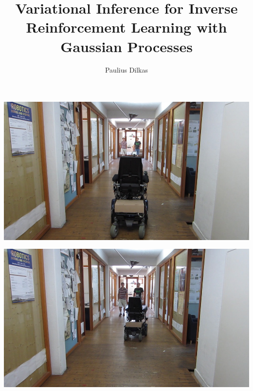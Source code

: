 \documentclass{beamer}
\author{Paulius Dilkas}
\title{Variational Inference for Inverse Reinforcement Learning with Gaussian
  Processes}
\begin{document}
\maketitle

\begin{frame}
  \includegraphics[width=\textwidth]{images/image-044.jpg}
  \begin{spacing}{0.5}
    {\tiny\color{gray}}
  \end{spacing}
\end{frame}

\begin{frame}
  \includegraphics[width=\textwidth]{images/image-045.jpg}
  \begin{spacing}{0.5}
    {\tiny\color{gray}}
  \end{spacing}
\end{frame}
\end{document}
